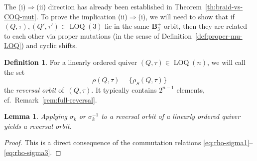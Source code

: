 \documentclass[11pt, letterpaper]{amsart}
\newtheorem{lemma}[theorem]{Lemma}
\theoremstyle{definition}
\newtheorem{definition}[theorem]{Definition}
\numberwithin{equation}{section}
\newcommand\LOQ{\operatorname{LOQ}}
\begin{document}
The (i)$\Rightarrow$(ii) direction has already been established in Theorem~\ref{th:braid-vs-COQ-mut}.
To prove the implication (ii)$\Rightarrow$(i), we will need to show that if $(Q,\tau),(Q',\tau')\in\LOQ(3)$
lie in the same $\mathbf{B}_3^{\pm}$-orbit, then they are related to each other via proper mutations
(in the sense of Definition~\ref{def:proper-mu-LOQ}) and cyclic shifts. 

\begin{definition}
%
For a linearly ordered quiver $(Q, \tau)\in\LOQ(n)$, %
we will call the set 
\begin{equation*}
\rho(Q,\tau) =\{\rho_S(Q, \tau)\}
\end{equation*}
the \emph{reversal orbit} of~$(Q, \tau)$.
It typically contains $2^{n-1}$ elements, cf.\ Remark~\ref{rem:full-reversal}. 
%
\end{definition}

\begin{lemma}
\label{lem:sigma-rhoQ}
Applying $\sigma_k$ or $\sigma_k^{-1}$ to a reversal orbit of a linearly ordered quiver yields a reversal orbit.
\end{lemma}

\begin{proof}
This is a direct consequence of the commutation relations \eqref{eq:rho-sigma1}--\eqref{eq:rho-sigma3}.
\end{proof}
\end{document}
